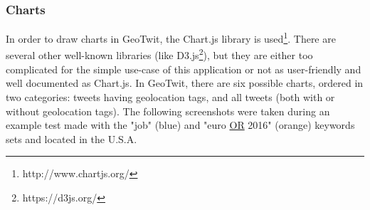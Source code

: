 \documentclass[a4paper,11pt]{report}
\begin{document}
\subsubsection{Charts}
\label{charts}
In order to draw charts in GeoTwit, the Chart.js library is used\footnote{http://www.chartjs.org/}. There are several other well-known libraries (like D3.js\footnote{https://d3js.org/}), but they are either too complicated for the simple use-case of this application or not as user-friendly and well documented as Chart.js.
In GeoTwit, there are six possible charts, ordered in two categories: tweets having geolocation tags, and all tweets (both with or without geolocation tags). The following screenshots were taken during an example test made with the \color{blue}"job" (blue) \color{black}and \color{Orange}"euro \underline{OR} 2016" (orange) \color{black}keywords sets and located in the U.S.A.
\end{document}
